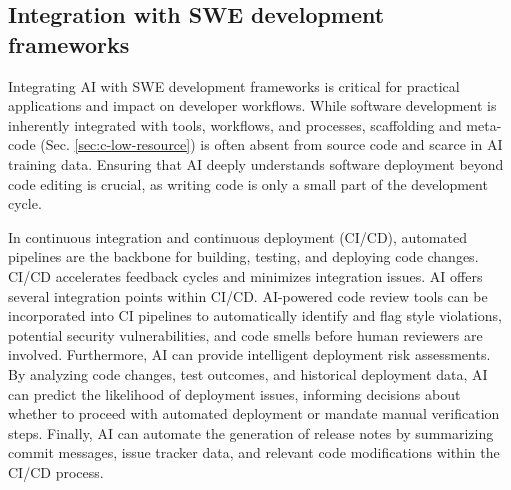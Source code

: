 

\subsection{Integration with SWE development frameworks}
Integrating AI with SWE development frameworks is critical for practical applications and impact on developer workflows. While software development is inherently integrated with tools, workflows, and processes, scaffolding and meta-code (Sec. \ref{sec:c-low-resource}) is often absent from source code and scarce in AI training data. Ensuring that AI deeply understands software deployment beyond code editing is crucial, as writing code is only a small part of the development cycle.

In continuous integration and continuous deployment (CI/CD), automated pipelines are the backbone for building, testing, and deploying code changes. CI/CD accelerates feedback cycles and minimizes integration issues. AI offers several integration points within CI/CD. AI-powered code review tools can be incorporated into CI pipelines to automatically identify and flag style violations, potential security vulnerabilities, and code smells before human reviewers are involved. Furthermore, AI can provide intelligent deployment risk assessments. By analyzing code changes, test outcomes, and historical deployment data, AI can predict the likelihood of deployment issues, informing decisions about whether to proceed with automated deployment or mandate manual verification steps. Finally, AI can automate the generation of release notes by summarizing commit messages, issue tracker data, and relevant code modifications within the CI/CD process.

